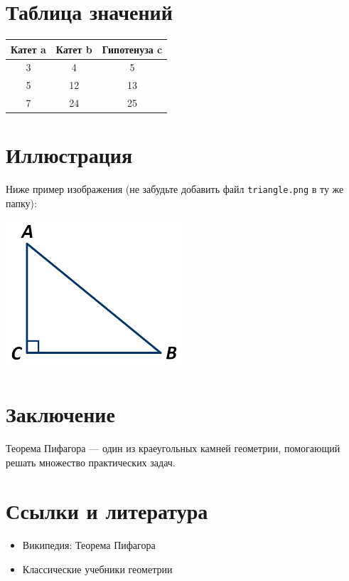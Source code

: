 \documentclass{article}
\begin{document}
\section{Таблица значений}
\begin{center}
    \begin{tabular}{|c|c|c|}
        \hline
        Катет a & Катет b & Гипотенуза c \\
        \hline
        3 & 4 & 5 \\
        \hline
        5 & 12 & 13 \\
        \hline
        7 & 24 & 25 \\
        \hline
    \end{tabular}
\end{center}

\section{Иллюстрация}
Ниже пример изображения (не забудьте добавить файл \texttt{triangle.png} в ту же папку):
\begin{center}
    \includegraphics[width=0.5\textwidth]{triangle.png}
\end{center}

\section{Заключение}
Теорема Пифагора — один из краеугольных камней геометрии, помогающий решать
множество практических задач.

\section{Ссылки и литература}
\begin{itemize}
    \item Википедия: Теорема Пифагора
    \item Классические учебники геометрии
\end{itemize}
\end{document}
